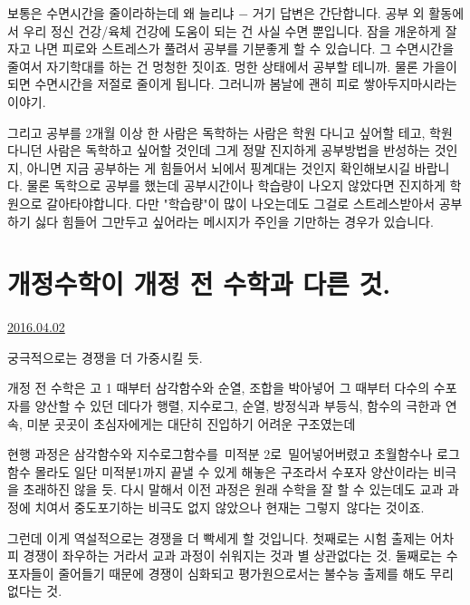 보통은 수면시간을 줄이라하는데 왜 늘리냐 $-$ 거기 답변은 간단합니다.
공부 외 활동에서 우리 정신 건강/육체 건강에 도움이 되는 건 사실 수면 뿐입니다.
잠을 개운하게 잘 자고 나면 피로와 스트레스가 풀려서 공부를 기분좋게 할 수 있습니다.
그 수면시간을 줄여서 자기학대를 하는 건 멍청한 짓이죠. 멍한 상태에서 공부할 테니까.
물론 가을이 되면 수면시간을 저절로 줄이게 됩니다. 그러니까 봄날에 괜히 피로 쌓아두지마시라는 이야기.
\vspace{5mm}

그리고 공부를 2개월 이상 한 사람은 독학하는 사람은 학원 다니고 싶어할 테고, 학원 다니던 사람은 독학하고 싶어할 것인데
그게 정말 진지하게 공부방법을 반성하는 것인지, 아니면 지금 공부하는 게 힘들어서 뇌에서 핑계대는 것인지 확인해보시길 바랍니다.
물론 독학으로 공부를 했는데 공부시간이나 학습량이 나오지 않았다면 진지하게 학원으로 갈아타야합니다.
다만 "학습량"이 많이 나오는데도 그걸로 스트레스받아서 공부하기 싫다 힘들어 그만두고 싶어라는 메시지가 주인을 기만하는 경우가 있습니다.
\vspace{5mm}









\section{개정수학이 개정 전 수학과 다른 것.}
\href{https://www.kockoc.com/Apoc/708462}{2016.04.02}

\vspace{5mm}

궁극적으로는 경쟁을 더 가중시킬 듯.
\vspace{5mm}

개정 전 수학은 고 1 때부터 삼각함수와 순열, 조합을 박아넣어 그 때부터 다수의 수포자를 양산할 수 있던 데다가
행렬, 지수로그, 순열, 방정식과 부등식, 함수의 극한과 연속, 미분 곳곳이 초심자에게는 대단히 진입하기 어려운 구조였는데
\vspace{5mm}

현행 과정은 삼각함수와 지수로그함수를 미적분 2로 밀어넣어버렸고
초월함수나 로그함수 몰라도 일단 미적분1까지 끝낼 수 있게 해놓은 구조라서 수포자 양산이라는 비극을 초래하진 않을 듯.
다시 말해서 이전 과정은 원래 수학을 잘 할 수 있는데도 교과 과정에 치여서 중도포기하는 비극도 없지 않았으나
현재는 그렇지 않다는 것이죠.
\vspace{5mm}

그런데 이게 역설적으로는 경쟁을 더 빡세게 할 것입니다.
첫째로는 시험 출제는 어차피 경쟁이 좌우하는 거라서 교과 과정이 쉬워지는 것과 별 상관없다는 것.
둘째로는 수포자들이 줄어들기 때문에 경쟁이 심화되고 평가원으로서는 불수능 출제를 해도 무리없다는 것.
\vspace{5mm}

